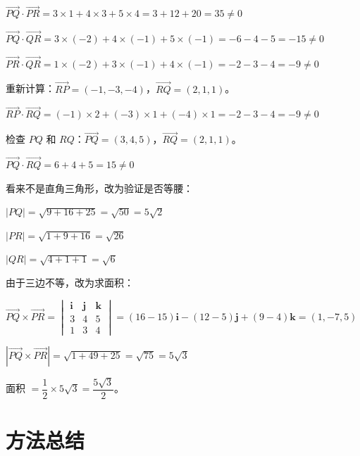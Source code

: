 \documentclass[11pt]{ctexrep}
\begin{document}
$\overrightarrow{PQ} \cdot \overrightarrow{PR} = 3 \times 1 + 4 \times 3 + 5 \times 4 = 3 + 12 + 20 = 35 \neq 0$

$\overrightarrow{PQ} \cdot \overrightarrow{QR} = 3 \times (-2) + 4 \times (-1) + 5 \times (-1) = -6 - 4 - 5 = -15 \neq 0$

$\overrightarrow{PR} \cdot \overrightarrow{QR} = 1 \times (-2) + 3 \times (-1) + 4 \times (-1) = -2 - 3 - 4 = -9 \neq 0$

重新计算：$\overrightarrow{RP} = (-1, -3, -4)$，$\overrightarrow{RQ} = (2, 1, 1)$。

$\overrightarrow{RP} \cdot \overrightarrow{RQ} = (-1) \times 2 + (-3) \times 1 + (-4) \times 1 = -2 - 3 - 4 = -9 \neq 0$

检查 $PQ$ 和 $RQ$：$\overrightarrow{PQ} = (3, 4, 5)$，$\overrightarrow{RQ} = (2, 1, 1)$。

$\overrightarrow{PQ} \cdot \overrightarrow{RQ} = 6 + 4 + 5 = 15 \neq 0$

看来不是直角三角形，改为验证是否等腰：

$|PQ| = \sqrt{9 + 16 + 25} = \sqrt{50} = 5\sqrt{2}$

$|PR| = \sqrt{1 + 9 + 16} = \sqrt{26}$

$|QR| = \sqrt{4 + 1 + 1} = \sqrt{6}$

由于三边不等，改为求面积：

$\overrightarrow{PQ} \times \overrightarrow{PR} = \begin{vmatrix} \boldsymbol{i} & \boldsymbol{j} & \boldsymbol{k} \\ 3 & 4 & 5 \\ 1 & 3 & 4 \end{vmatrix} = (16-15)\boldsymbol{i} - (12-5)\boldsymbol{j} + (9-4)\boldsymbol{k} = (1, -7, 5)$

$|\overrightarrow{PQ} \times \overrightarrow{PR}| = \sqrt{1 + 49 + 25} = \sqrt{75} = 5\sqrt{3}$

面积 $= \dfrac{1}{2} \times 5\sqrt{3} = \dfrac{5\sqrt{3}}{2}$。

\section*{方法总结}
\end{document}
